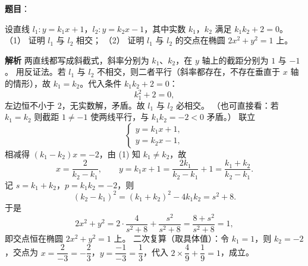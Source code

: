 \begin{answer}

\textbf{题目}：

设直线 $l_1:y=k_1x+1$，$l_2:y=k_2x-1$，其中实数 $k_1$，$k_2$ 满足 $k_1k_2+2=0$。
（1） 证明 $l_1$ 与 $l_2$ 相交；
（2） 证明 $l_1$ 与 $l_2$ 的交点在椭圆 $2x^2+y^2=1$ 上。

\textbf{解析}
两直线都写成斜截式，斜率分别为 $k_1$、$k_2$，在 $y$ 轴上的截距分别为 $1$ 与 $-1$。
用反证法。若 $l_1$ 与 $l_2$ 不相交，则二者平行（斜率都存在，不存在垂直于 $x$ 轴的情形），故 $k_1=k_2$。代入条件 $k_1k_2+2=0$：
\nopagebreak[4]
\[
k_1^2+2=0,
\]
左边恒不小于 $2$，无实数解，矛盾。故 $l_1$ 与 $l_2$ 必相交。
（也可直接看：若 $k_1=k_2$ 则截距 $1\neq-1$ 使两线平行，与 $k_1k_2=-2<0$ 矛盾。）
联立
\nopagebreak[4]
\[
\begin{cases}y=k_1x+1,\\ y=k_2x-1,\end{cases}
\]
相减得 $(k_1-k_2)x=-2$，由 (1) 知 $k_1\neq k_2$，故
\nopagebreak[4]
\[
x=\frac{2}{k_2-k_1},\qquad y=k_1x+1=\frac{2k_1}{k_2-k_1}+1=\frac{k_1+k_2}{k_2-k_1}.
\]
记 $s=k_1+k_2$，$p=k_1k_2=-2$，则
\nopagebreak[4]
\[
(k_2-k_1)^2=(k_1+k_2)^2-4k_1k_2=s^2+8.
\]
于是
\nopagebreak[4]
\[
2x^2+y^2=2\cdot\frac{4}{s^2+8}+\frac{s^2}{s^2+8}=\frac{8+s^2}{s^2+8}=1,
\]
即交点恒在椭圆 $2x^2+y^2=1$ 上。
二次复算（取具体值）：令 $k_1=1$，则 $k_2=-2$，交点为 $x=\dfrac{2}{-3}=-\dfrac23$，$y=\dfrac{-1}{-3}=\dfrac13$，代入 $2\times\dfrac49+\dfrac19=1$，成立。



\end{answer}
